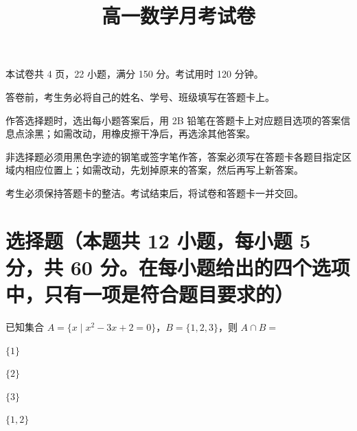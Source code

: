 \documentclass{exam-zh}
\begin{document}
\secret  %

\title{高一数学月考试卷}
\subject{数学}
\maketitle


\begin{notice}
  \item 本试卷共 4 页，22 小题，满分 150 分。考试用时 120 分钟。
  \item 答卷前，考生务必将自己的姓名、学号、班级填写在答题卡上。
  \item 作答选择题时，选出每小题答案后，用 2B 铅笔在答题卡上对应题目选项的答案信息点涂黑；如需改动，用橡皮擦干净后，再选涂其他答案。
  \item 非选择题必须用黑色字迹的钢笔或签字笔作答，答案必须写在答题卡各题目指定区域内相应位置上；如需改动，先划掉原来的答案，然后再写上新答案。
  \item 考生必须保持答题卡的整洁。考试结束后，将试卷和答题卡一并交回。
\end{notice}

\vspace{1em}

\section{选择题（本题共 12 小题，每小题 5 分，共 60 分。在每小题给出的四个选项中，只有一项是符合题目要求的）}

\begin{question}
  已知集合 $A = \{x \mid x^2 - 3x + 2 = 0\}$，$B = \{1, 2, 3\}$，则 $A \cap B = $ \paren[D]
  \begin{choices}
    \item $\{1\}$
    \item $\{2\}$
    \item $\{3\}$
    \item $\{1, 2\}$
  \end{choices}
\end{question}
\end{document}
